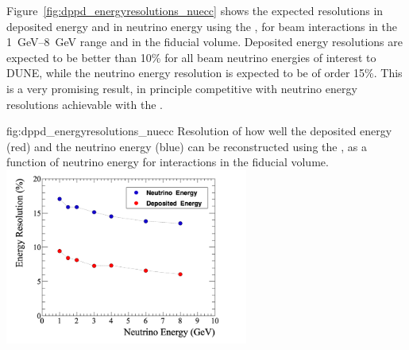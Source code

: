 Figure~\ref{fig:dppd_energyresolutions_nuecc} shows the expected resolutions in deposited  energy and in neutrino  energy using the , for beam \nue {} interactions in the \SIrange{1}{8}{GeV} range and in the \lar fiducial volume. Deposited energy resolutions are expected to be better than \num{10}\% for all beam neutrino energies of interest to DUNE, while the neutrino energy resolution is expected to be of order \num{15}\%. This is a very promising result, in principle competitive with neutrino energy resolutions achievable with the .

\begin{dunefigure}{fig:dppd_energyresolutions_nuecc}
{Resolution of how well the deposited energy (red) and the neutrino energy (blue) can be reconstructed using the , as a function of neutrino energy for \nue {} interactions in the \lar fiducial volume.}
\includegraphics[width=0.60\textwidth]{graphics/dppd_energyresolutions_nuecc.png}
\end{dunefigure}
